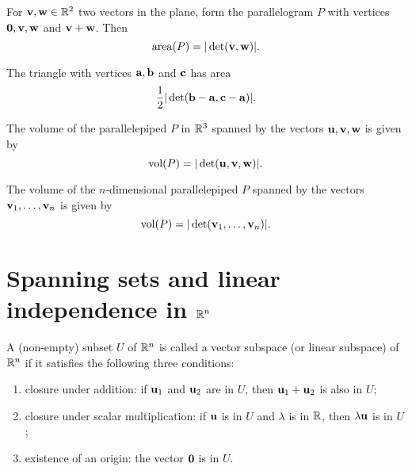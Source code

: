 \documentclass[10pt, a4paper]{article}
\begin{document}
\begin{theorem}
    For $\mathbf{v, w} \in \mathbb{R} ^ 2$ two vectors in the plane,
    form the parallelogram $P$ with vertices $\mathbf{0, v, w}$ and $\mathbf{v + w}$.
    Then
    \[
    \mathrm{area}(P) = |\det(\mathbf{v, w})|.
    \]
\end{theorem}

\begin{proposition}
    The triangle with vertices $\mathbf{a, b}$ and $\mathbf{c}$ has area
    \[
    \frac{1}{2}|\det(\mathbf{b - a, c - a})|.
    \]
\end{proposition}

\begin{proposition}
    The volume of the parallelepiped $P$ in $\mathbb{R} ^ 3$ spanned by the vectors $\mathbf{u, v, w}$ is given by
    \[
    \mathrm{vol}(P) = |\det(\mathbf{u, v, w})|.
    \]
\end{proposition}

\begin{remark}
    The volume of the $n$-dimensional parallelepiped $P$ spanned by the vectors $\mathbf{v}_1, \dotsc, \mathbf{v}_n$ is given by
    \[
    \mathrm{vol}(P) = |\det(\mathbf{v}_1, \dotsc, \mathbf{v}_n)|.
    \]
\end{remark}

\newpage

\section{Spanning sets and linear independence in \texorpdfstring{$\mathbb{R} ^ n$}{}}

\begin{definition}
    A (non-empty) subset $U$ of $\mathbb{R} ^ n$ is called a vector subspace (or linear subspace) of $\mathbb{R} ^ n$ if it satisfies the following three conditions:
    \begin{enumerate}[label = (\roman*)]
        \item closure under addition:
        if $\mathbf{u}_1$ and $\mathbf{u}_2$ are in $U$,
        then $\mathbf{u}_1 + \mathbf{u}_2$ is also in $U$;
        \item closure under scalar multiplication:
        if $\mathbf{u}$ is in $U$ and $\lambda$ is in $\mathbb{R}$,
        then $\lambda\mathbf{u}$ is in $U$;
        \item existence of an origin:
        the vector $\mathbf{0}$ is in $U$.
    \end{enumerate}
\end{definition}
\end{document}
